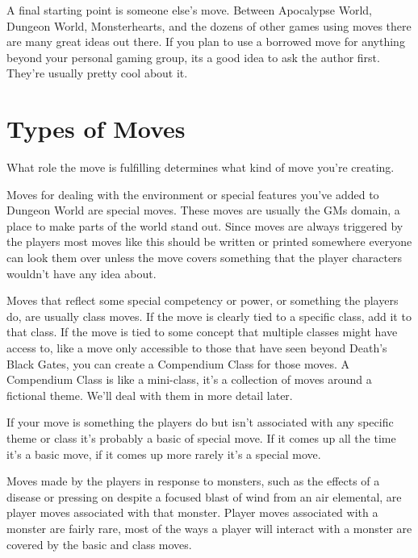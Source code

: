 A final starting point is someone else's move. Between Apocalypse World, Dungeon World, Monsterhearts, and the dozens of other games using moves there are many great ideas out there. If you plan to use a borrowed move for anything beyond your personal gaming group, its a good idea to ask the author first. They're usually pretty cool about it.

       
\section{Types of Moves}    
       

What role the move is fulfilling determines what kind of move you're creating.

       

Moves for dealing with the environment or special features you've added to Dungeon World are special moves. These moves are usually the GMs domain, a place to make parts of the world stand out. Since moves are always triggered by the players most moves like this should be written or printed somewhere everyone can look them over unless the move covers something that the player characters wouldn't have any idea about.

       

Moves that reflect some special competency or power, or something the players do, are usually class moves. If the move is clearly tied to a specific class, add it to that class. If the move is tied to some concept that multiple classes might have access to, like a move only accessible to those that have seen beyond Death's Black Gates, you can create a Compendium Class for those moves. A Compendium Class is like a mini-class, it's a collection of moves around a fictional theme. We'll deal with them in more detail later.

       

If your move is something the players do but isn't associated with any specific theme or class it's probably a basic of special move. If it comes up all the time it's a basic move, if it comes up more rarely it's a special move.

       

Moves made by the players in response to monsters, such as the effects of a disease or pressing on despite a focused blast of wind from an air elemental, are player moves associated with that monster. Player moves associated with a monster are fairly rare, most of the ways a player will interact with a monster are covered by the basic and class moves.

